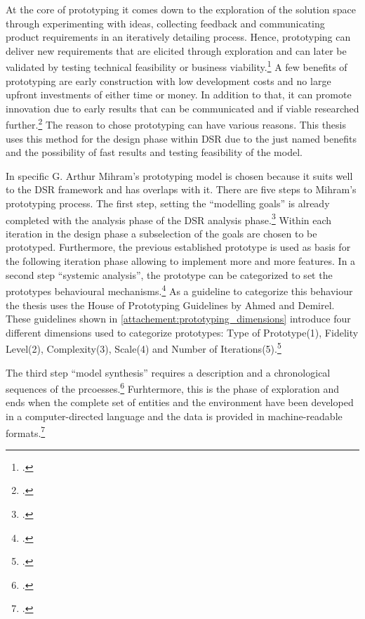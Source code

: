 At the core of prototyping it comes down to the exploration of the solution space through experimenting with ideas,
collecting feedback and
communicating product requirements in an iteratively detailing process.
Hence, prototyping can deliver new requirements that are elicited through exploration and can later be validated 
by testing technical feasibility or business viability.\footcite[cf.][8]{bjarnasonModelSoftwarePrototyping2021a}
A few benefits of prototyping are early construction with low development costs and no large upfront investments of either time or money.
In addition to that, it can promote innovation due to early results that can be communicated and if viable researched further.\footcite[cf.][25]{nelsonSoftwarePrototyping2016}
The reason to chose prototyping can have various reasons. 
This thesis uses this method for the design phase within \ac{DSR} due to the just named benefits and the possibility of fast results and testing feasibility of the model.

In specific G. Arthur Mihram's prototyping model is chosen because it suits well to the \ac{DSR} framework and has overlaps with it. 
There are five steps to Mihram's prototyping process.
The first step, setting the ``modelling goals'' is already completed with the analysis phase of the \ac{DSR} analysis phase.\footcite[cf.][71]{mihramSimulationMethodology1976}
Within each iteration in the design phase a subselection of the goals are chosen to be prototyped. 
Furthermore, the previous established prototype is used as basis for the following iteration phase allowing to implement more and more features.
In a second step ``systemic analysis'', the prototype can be categorized to set the prototypes behavioural mechanisms.\footcite[cf.][71-72]{mihramSimulationMethodology1976}
As a guideline to categorize this behaviour the thesis uses the House of Prototyping Guidelines by Ahmed and Demirel.
These guidelines shown in \ref{attachement:prototyping_dimensions} introduce four different dimensions used to categorize prototypes:
Type of Prototype(1), Fidelity Level(2), Complexity(3), Scale(4) and Number of Iterations(5).\footcite[cf.][6-7]{ahmedPrototypingFrameworkHumanCentered2021}

The third step ``model synthesis'' requires a description and a chronological sequences of the prcoesses.\footcite[cf.][71-72]{mihramSimulationMethodology1976}
Furhtermore, this is the phase of exploration and ends when the complete set of entities and the environment have been developed in a computer-directed language and the data is provided in machine-readable formats.\footcite[cf.][75-76]{mihramSimulationMethodology1976}

